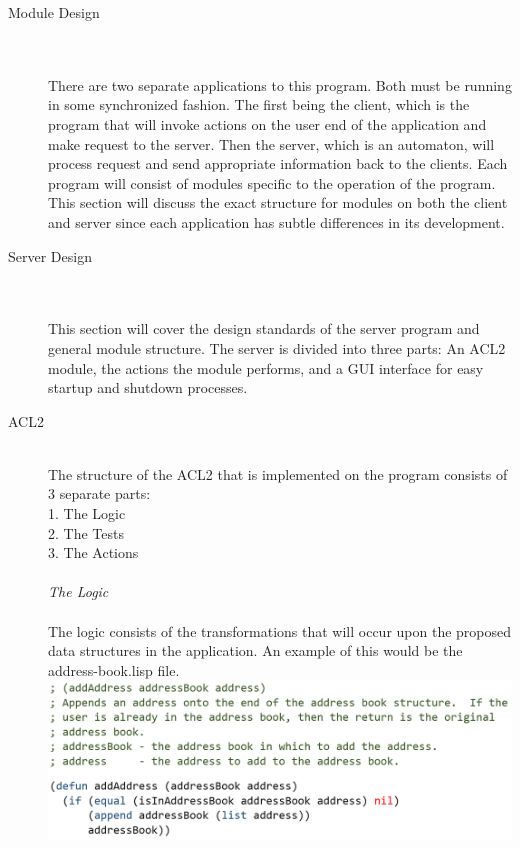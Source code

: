 \documentclass[11pt, letterpaper]{report}
\begin{document}
\begin{description}
\newpage
\hypertarget{Component Design} {}
\item[\Large Module Design] \hfill \\ \hfill \\
There are two separate applications to this program. Both must be running in some synchronized fashion. The first being the client, which is the program that will invoke actions on the user end of the application and make request to the server. Then the server, which is an automaton, will process request and send appropriate information back to the clients. Each program will consist of modules specific to the operation of the program. This section will discuss the exact structure for modules on both the client and server since each application has subtle differences in its development. \\
\item[\large Server Design] \hfill \\ \hfill \\
This section will cover the design standards of the server program and general module structure. The server is divided into three parts: An ACL2 module, the actions the module performs, and a GUI interface for easy startup and shutdown processes.
\item[ACL2]\hfill \\
The structure of the ACL2 that is implemented on the program consists of 3 separate parts:\\
1.	The Logic\\
2.	The Tests\\
3.	The Actions\\\\
\textit{The Logic}\\\\
The logic consists of the transformations that will occur upon the proposed data structures in the application.  An example of this would be the address-book.lisp file.\\

\includegraphics[scale=.3]{addbk}\\


\end{description}
\end{document}
